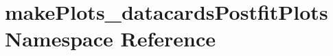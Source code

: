 \hypertarget{namespacemakePlots__datacardsPostfitPlots}{
\section{makePlots\_\-datacardsPostfitPlots Namespace Reference}
\label{namespacemakePlots__datacardsPostfitPlots}
}

